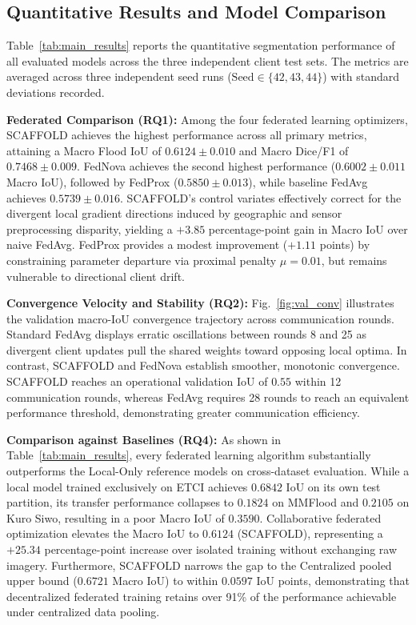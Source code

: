 \documentclass[conference]{IEEEtran}
\begin{document}
\subsection{Quantitative Results and Model Comparison}
Table~\ref{tab:main_results} reports the quantitative segmentation performance of all evaluated models across the three independent client test sets. The metrics are averaged across three independent seed runs ($\text{Seed} \in \{42, 43, 44\}$) with standard deviations recorded.

\textbf{Federated Comparison (RQ1):} Among the four federated learning optimizers, SCAFFOLD achieves the highest performance across all primary metrics, attaining a Macro Flood IoU of $0.6124 \pm 0.010$ and Macro Dice/F1 of $0.7468 \pm 0.009$. FedNova achieves the second highest performance ($0.6002 \pm 0.011$ Macro IoU), followed by FedProx ($0.5850 \pm 0.013$), while baseline FedAvg achieves $0.5739 \pm 0.016$. SCAFFOLD's control variates effectively correct for the divergent local gradient directions induced by geographic and sensor preprocessing disparity, yielding a $+3.85$ percentage-point gain in Macro IoU over naive FedAvg. FedProx provides a modest improvement ($+1.11$ points) by constraining parameter departure via proximal penalty $\mu=0.01$, but remains vulnerable to directional client drift.

\textbf{Convergence Velocity and Stability (RQ2):} Fig.~\ref{fig:val_conv} illustrates the validation macro-IoU convergence trajectory across communication rounds. Standard FedAvg displays erratic oscillations between rounds 8 and 25 as divergent client updates pull the shared weights toward opposing local optima. In contrast, SCAFFOLD and FedNova establish smoother, monotonic convergence. SCAFFOLD reaches an operational validation IoU of $0.55$ within 12 communication rounds, whereas FedAvg requires 28 rounds to reach an equivalent performance threshold, demonstrating greater communication efficiency.

\textbf{Comparison against Baselines (RQ4):} As shown in Table~\ref{tab:main_results}, every federated learning algorithm substantially outperforms the Local-Only reference models on cross-dataset evaluation. While a local model trained exclusively on ETCI achieves $0.6842$ IoU on its own test partition, its transfer performance collapses to $0.1824$ on MMFlood and $0.2105$ on Kuro Siwo, resulting in a poor Macro IoU of $0.3590$. Collaborative federated optimization elevates the Macro IoU to $0.6124$ (SCAFFOLD), representing a $+25.34$ percentage-point increase over isolated training without exchanging raw imagery. Furthermore, SCAFFOLD narrows the gap to the Centralized pooled upper bound ($0.6721$ Macro IoU) to within $0.0597$ IoU points, demonstrating that decentralized federated training retains over 91\% of the performance achievable under centralized data pooling.
\end{document}
